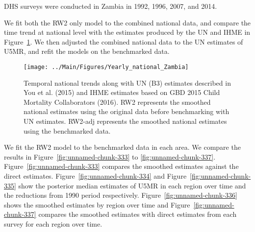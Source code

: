 \documentclass[12pt]{article}\usepackage[]{graphicx}\usepackage[]{color}
\newenvironment{knitrout}{}{} %
\begin{document}


DHS surveys were conducted in Zambia in 1992, 1996, 2007, and 2014.

We fit both the RW2 only model to the combined national data, and compare the time trend at national level with the estimates produced by the UN and IHME in Figure~\ref{fig:unnamed-chunk-332}. We then adjusted the combined national data to the UN estimates of U5MR, and refit the models on the benchmarked data. 

\begin{knitrout}
\color{fgcolor}\begin{figure}[bht]

{\centering \texttt{[image: ../Main/Figures/Yearly\_national\_Zambia]} 

}

\caption[Temporal national trends along with UN (B3) estimates described in You et al]{Temporal national trends along with UN (B3) estimates described in You et al. (2015) and IHME estimates based on GBD 2015 Child Mortality Collaborators (2016). RW2 represents the smoothed national estimates using the original data before benchmarking with UN estimates. RW2-adj represents the smoothed national estimates using the benchmarked data.}\label{fig:unnamed-chunk-332}
\end{figure}


\end{knitrout}
 

We fit the RW2 model to the benchmarked data in each area. 
We compare the results in Figure~\ref{fig:unnamed-chunk-333} to \ref{fig:unnamed-chunk-337}.
Figure~\ref{fig:unnamed-chunk-333} compares the smoothed estimates against the direct estimates. Figure~\ref{fig:unnamed-chunk-334} and Figure~\ref{fig:unnamed-chunk-335} show the posterior median estimates of U5MR in each region over time and the reductions from 1990 period respectively.
Figure~\ref{fig:unnamed-chunk-336} shows the smoothed estimates by region over time and Figure~\ref{fig:unnamed-chunk-337} compares the smoothed estimates with direct estimates from each survey for each region over time.


\end{document}
